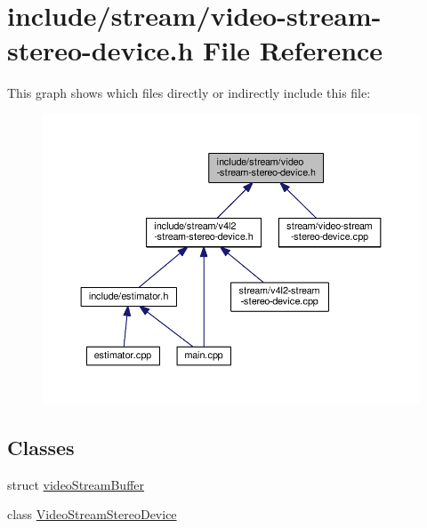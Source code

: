 \hypertarget{video-stream-stereo-device_8h}{}\section{include/stream/video-\/stream-\/stereo-\/device.h File Reference}
\label{video-stream-stereo-device_8h}
This graph shows which files directly or indirectly include this file\+:
\nopagebreak
\begin{figure}[H]
\begin{center}
\leavevmode
\includegraphics[width=350pt]{video-stream-stereo-device_8h__dep__incl}
\end{center}
\end{figure}
\subsection*{Classes}
\begin{DoxyCompactItemize}
\item 
struct \hyperlink{structvideoStreamBuffer}{video\+Stream\+Buffer}
\item 
class \hyperlink{classVideoStreamStereoDevice}{Video\+Stream\+Stereo\+Device}
\end{DoxyCompactItemize}
